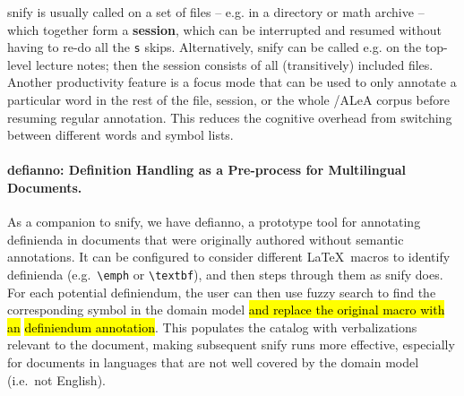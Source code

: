 \documentclass[runningheads]{llncs}
\def\edited#1{\hl{#1}}
\newcommand\ALeA{\textsf{ALeA}\xspace}
\newcommand\snify{\textsf{snify}\xspace}
\newcommand\defianno{\textsf{defianno}\xspace}
\begin{document}
\snify is usually called on a set of files -- e.g. in a directory or math archive -- which
together form a \textbf{session}, which can be interrupted and resumed without having to
re-do all the \lstinline|s| skips. Alternatively, \snify can be called e.g. on the
top-level lecture notes; then the session consists of all (transitively) included
files. Another productivity feature is a focus mode that can be used to only annotate
a particular word in the rest of the file, session, or the whole \sTeX/\ALeA corpus before
resuming regular annotation. This reduces the cognitive overhead from switching between
different words and symbol lists.

\paragraph{\defianno: Definition Handling as a Pre-process for Multilingual Documents.}
As a companion to \snify, we have \defianno, a prototype tool for annotating definienda in
documents that were originally authored without semantic annotations.  It can be
configured to consider different \LaTeX\ macros to identify definienda (e.g.\
\lstinline[language={}]|\emph| or \lstinline[language={}]|\textbf|), and then steps
through them as \snify does.
For each potential definiendum, the user can then use fuzzy
search to find the corresponding symbol in the domain model
\edited{and replace the original macro with an} \sTeX \edited{definiendum annotation}.
This populates the catalog
with verbalizations relevant to the document, making subsequent \snify runs more
effective, especially for documents in languages that are not well covered by the domain
model (i.e.\ not English).
\end{document}
